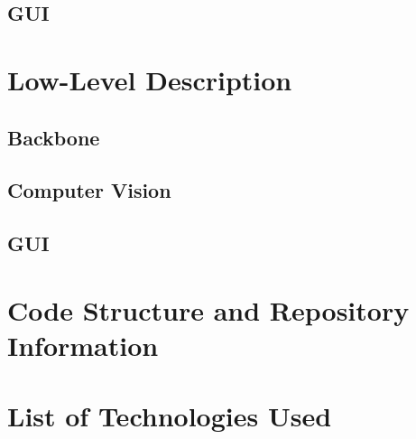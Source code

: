 \documentclass{article}
\begin{document}
\subsection{GUI}

\section{Low-Level Description}

\subsection{Backbone}

\subsection{Computer Vision}

\subsection{GUI}

\section{Code Structure and Repository Information}

\section{List of Technologies Used}
\end{document}
